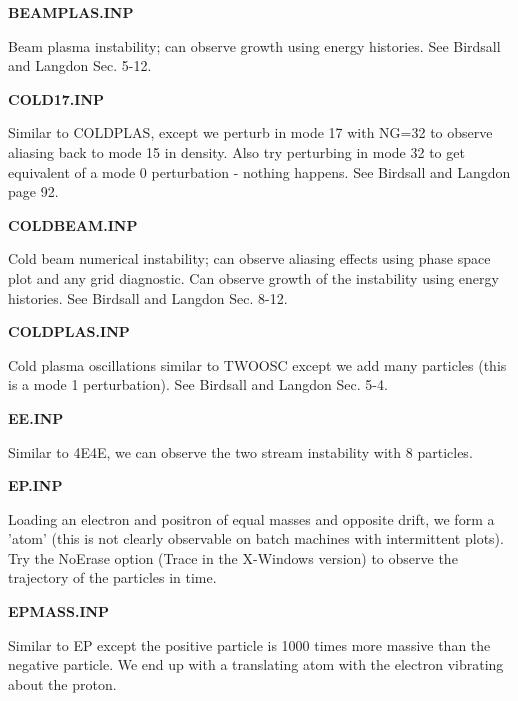 \begin{section}
\begin{subsection}
\begin{subsubsection}
{\bf BEAMPLAS.INP}

      Beam plasma instability; can observe growth using energy histories.  See
      Birdsall and Langdon Sec. 5-12.
\end{subsubsection}

\begin{subsubsection}
{\bf COLD17.INP}

      Similar to COLDPLAS, except we perturb in mode 17 with NG=32 to observe
      aliasing back to mode 15 in density.  Also try perturbing in mode 32 to
      get equivalent of a mode 0 perturbation - nothing happens.  See Birdsall
      and Langdon page 92.
\end{subsubsection}

\begin{subsubsection}
{\bf COLDBEAM.INP}

      Cold beam numerical instability; can observe aliasing effects using phase
      space plot and any grid diagnostic.  Can observe growth of the
      instability using energy histories.  See Birdsall and Langdon Sec. 8-12.
\end{subsubsection}

\begin{subsubsection}
{\bf COLDPLAS.INP}

      Cold plasma oscillations similar to TWOOSC except we add many particles
      (this is a mode 1 perturbation).  See Birdsall and Langdon Sec. 5-4.
\end{subsubsection}

\begin{subsubsection}
{\bf EE.INP}

      Similar to 4E4E, we can observe the two stream instability with 8
      particles.
\end{subsubsection}

\begin{subsubsection}
{\bf EP.INP}

      Loading an electron and positron of equal masses and opposite drift, we
      form a 'atom' (this is not clearly observable on batch machines with
      intermittent plots).  Try the NoErase option (Trace in the X-Windows
      version) to observe the trajectory of the particles in time.
\end{subsubsection}

\begin{subsubsection}
{\bf EPMASS.INP}

      Similar to EP except the positive particle is 1000 times more massive
      than the negative particle.  We end up with a translating atom with the
      electron vibrating about the proton.
\end{subsubsection}


\end{subsection}
\end{section}
